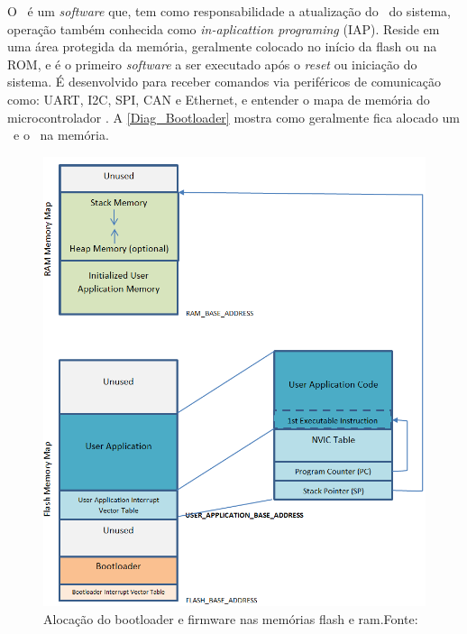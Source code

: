O \bootloader\ é um \textit{software} que, tem como responsabilidade a atualização do \firmware\ do sistema, operação também conhecida como \textit{in-aplicattion programing} (IAP). Reside em uma área protegida da memória, geralmente colocado no início da flash ou na ROM, e é o primeiro \textit{software} a ser executado após o \textit{reset} ou iniciação do sistema.
É desenvolvido para receber comandos via periféricos de comunicação como: UART, I2C, SPI, CAN e Ethernet, e entender o mapa de memória do microcontrolador \cite{DavesDurlin2013}. A \autoref{Diag_Bootloader} mostra como geralmente fica alocado um \bootloader\ e o \firmware\ na memória.

\begin{figure}[H]
    \scriptsize
     \centering
     \includegraphics[scale=0.7]{dados/figuras/DiagBootloaderOriginal.png}
     \caption{Alocação do bootloader e firmware nas memórias flash e ram.\newline Fonte:\cite{DavesDurlin2013}}
     \label{Diag_Bootloader}
\end{figure}

